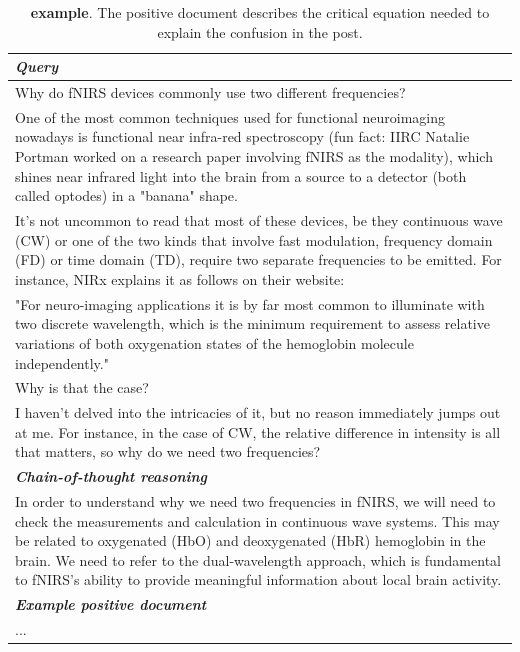 \begin{table}[ht]
\caption{\textbf{\psychology example}. The positive document describes the critical equation needed to explain the confusion in the post.}
\centering
\begin{tabular}{p{13cm}}
\toprule
\textit{\textbf{Query}} \\
\midrule
Why do fNIRS devices commonly use two different frequencies? \\
One of the most common techniques used for functional neuroimaging nowadays is functional near infra-red spectroscopy (fun fact: IIRC Natalie Portman worked on a research paper involving fNIRS as the modality), which shines near infrared light into the brain from a source to a detector (both called optodes) in a "banana" shape. \\
It's not uncommon to read that most of these devices, be they continuous wave (CW) or one of the two kinds that involve fast modulation, frequency domain (FD) or time domain (TD), require two separate frequencies to be emitted. For instance, NIRx explains it as follows on their website: \\
"For neuro-imaging applications it is by far most common to illuminate with two discrete wavelength, which is the minimum requirement to assess relative variations of both oxygenation states of the hemoglobin molecule independently." \\
Why is that the case? \\
I haven't delved into the intricacies of it, but no reason immediately jumps out at me. For instance, in the case of CW, the relative difference in intensity is all that matters, so why do we need two frequencies? \\
\midrule
\textit{\textbf{Chain-of-thought reasoning}} \\
\midrule
In order to understand why we need two frequencies in fNIRS, we will need to check the measurements and calculation in continuous wave systems. 
This may be related to oxygenated (HbO) and deoxygenated (HbR) hemoglobin in the brain. 
We need to refer to the dual-wavelength approach, which is fundamental to fNIRS's ability to provide meaningful information about local brain activity.\\
\midrule
\textit{\textbf{Example positive document}} \\
\midrule
... \\

\end{tabular}
\end{table}
